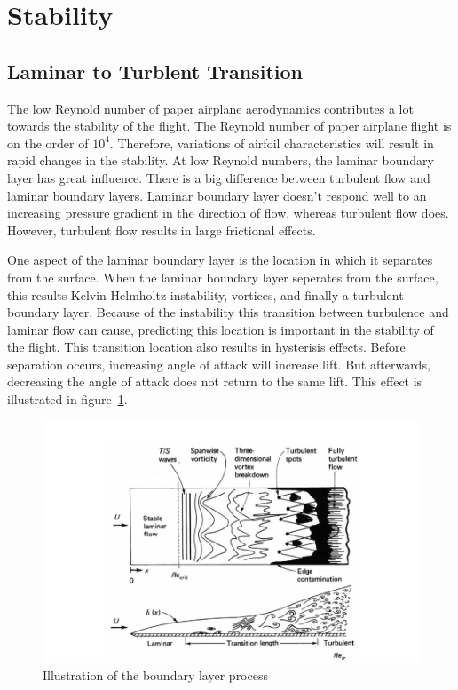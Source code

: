 
\section{Stability}

\subsection{Laminar to Turblent Transition}

The low Reynold number of paper airplane aerodynamics contributes a lot towards the
stability of the flight.
The Reynold number of paper airplane flight is on the order of $10^4$.
Therefore, variations of airfoil characteristics will result in rapid changes in 
the stability. At low Reynold numbers, the laminar boundary layer has great 
influence. There is a big difference between turbulent flow and laminar boundary
layers. Laminar boundary layer doesn't respond well to an increasing
pressure gradient in the direction of flow, whereas turbulent flow does.
However, turbulent flow results in large frictional effects.

One aspect of the laminar boundary layer is the location in which it separates from the surface.
When the laminar boundary layer seperates from the surface, this results Kelvin
Helmholtz instability, vortices, and finally a turbulent boundary layer. 
Because of the instability this transition between turbulence and laminar flow 
can cause, predicting this location is important in the stability of the flight.
This transition location also results in hysterisis effects. Before separation
occurs, increasing angle of attack will increase lift. But afterwards,
decreasing the angle of attack does not return to the same lift. This effect is
illustrated in figure~\ref{fig:boundary_layer_transition}.

\begin{figure}[hl]
  \centering
    \includegraphics[scale=.5]{figures/boundary_layer_transition.png}
    \caption{Illustration of the boundary layer process}
  \label{fig:boundary_layer_transition}
\end{figure}



